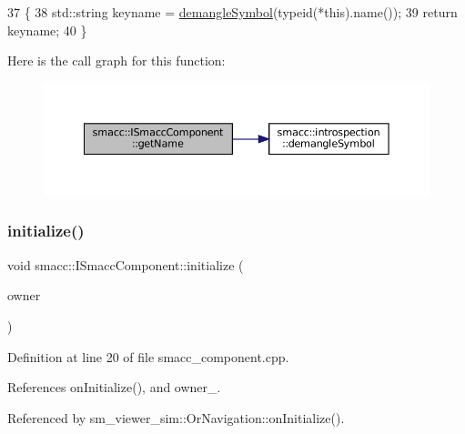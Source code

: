 \begin{DoxyCode}
37 \{
38     std::string keyname = \hyperlink{namespacesmacc_1_1introspection_a2f495108db3e57604d8d3ff5ef030302}{demangleSymbol}(\textcolor{keyword}{typeid}(*this).name());
39     \textcolor{keywordflow}{return} keyname;
40 \}
\end{DoxyCode}
Here is the call graph for this function\+:
\nopagebreak
\begin{figure}[H]
\begin{center}
\leavevmode
\includegraphics[width=350pt]{classsmacc_1_1ISmaccComponent_a8bfa94b1b1c616d55837ebba1b426c6e_cgraph}
\end{center}
\end{figure}
\mbox{\label{classsmacc_1_1ISmaccComponent_a3378552cb1a86aa26a07c0edc057448b}} 
\subsubsection{\texorpdfstring{initialize()}{initialize()}}
{\footnotesize\ttfamily void smacc\+::\+I\+Smacc\+Component\+::initialize (\begin{DoxyParamCaption}\item[{\hyperlink{classsmacc_1_1ISmaccClient}{I\+Smacc\+Client} $\ast$}]{owner }\end{DoxyParamCaption})\hspace{0.3cm}{\ttfamily [protected]}}



Definition at line 20 of file smacc\+\_\+component.\+cpp.



References on\+Initialize(), and owner\+\_\+.



Referenced by sm\+\_\+viewer\+\_\+sim\+::\+Or\+Navigation\+::on\+Initialize().


